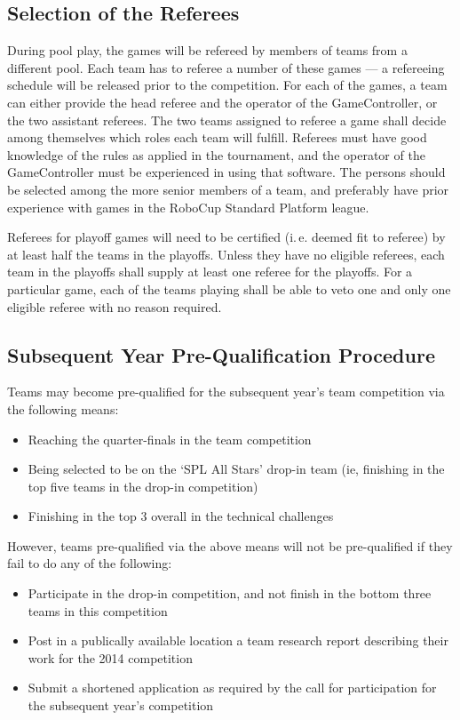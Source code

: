 \documentclass[12pt]{article}
\newcommand{\ie}{\mbox{i.\,e.}\xspace}
\begin{document}
\subsection{Selection of the Referees}
\label{sec:refSelection}
During pool play, the games will be refereed by members of teams from a different pool. Each team has to referee a number of these games --- a refereeing schedule will be released prior to the competition. For each of the games, a team can either provide the head referee and the operator of the GameController, or the two assistant referees.  The two teams assigned to referee a game shall decide among themselves which roles each team will fulfill.  Referees must have good knowledge of the rules as applied in the tournament, and the operator of the GameController must be experienced in using that software. The persons should be selected among the more senior members of a team, and preferably have prior experience with games in the RoboCup Standard Platform league.

Referees for playoff games will need to be certified (\ie deemed fit to referee) by at least half the teams in the playoffs. Unless they have no eligible referees, each team in the playoffs shall supply at least one referee for the playoffs. For a particular game, each of the teams playing shall be able to veto one and only one eligible referee with no reason required.

\subsection{Subsequent Year Pre-Qualification Procedure}
\label{sec:preQual}
Teams may become pre-qualified for the subsequent year's team competition via the following means:
\begin{itemize}
\item Reaching the quarter-finals in the team competition
\item Being selected to be on the `SPL All Stars' drop-in team (ie, finishing in the top five teams in the drop-in competition)
\item Finishing in the top 3 overall in the technical challenges
\end{itemize}

However, teams pre-qualified via the above means will not be pre-qualified if they fail to do any of the following:
\begin{itemize}
\item Participate in the drop-in competition, and not finish in the bottom three teams in this competition
\item Post in a publically available location a team research report describing their work for the 2014 competition
\item Submit a shortened application as required by the call for participation for the subsequent year's competition
\end{itemize}
\end{document}
